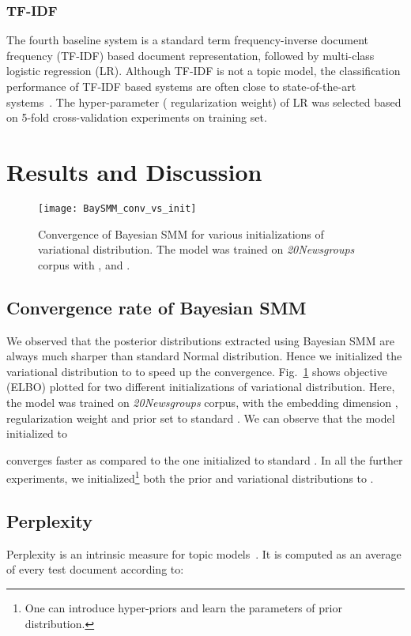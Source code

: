 \documentclass[journal]{IEEEtran}
\newcommand{\Nor}{}
\begin{document}
\subsubsection{TF-IDF}
The fourth baseline system is a standard term frequency-inverse document 
frequency (TF-IDF) based document representation, followed by multi-class 
logistic regression (LR). Although TF-IDF is not a topic model, the 
classification performance of TF-IDF based systems are often close to 
state-of-the-art systems~\cite{May:2015:mivec}. The hyper-parameter
( regularization weight) of LR was selected based on 5-fold 
cross-validation experiments on training set.

\section{Results and Discussion}
\label{sec:results}

\begin{figure}[t!]
  \centering
  \texttt{[image: BaySMM\_conv\_vs\_init]}
  \caption{\label{fig:conv} Convergence of Bayesian SMM for various 
    initializations of variational distribution. The model was trained on 
    \textit{20Newsgroups} corpus with , and .}
\end{figure}
\subsection{Convergence rate of Bayesian SMM}
\label{ssec:conv}
We observed that the posterior distributions extracted using Bayesian SMM are
always much sharper than standard Normal distribution. Hence we initialized 
the variational distribution to  
to speed up the convergence. Fig.~\ref{fig:conv} shows objective (ELBO) plotted 
for two different initializations of variational distribution. Here, the model 
was trained on \textit{20Newsgroups} corpus, with the embedding dimension 
, regularization weight  and prior 
set to standard \Nor. We can observe that the model initialized to 

converges faster as compared to the one initialized to standard \Nor. In all 
the further experiments, we initialized\footnote{One can introduce hyper-priors 
and learn the parameters of prior distribution.} both the prior and variational 
distributions to .



 
\subsection{Perplexity}
Perplexity is an intrinsic measure for topic 
models~\cite{DBM:2013:Hinton,NVI:2016}. It is computed as an average of 
every test document according to:
\end{document}
